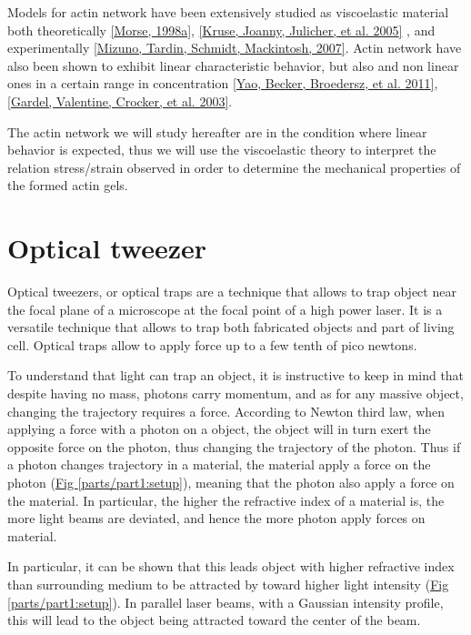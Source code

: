 \documentclass[A4paperpaper,11pt,english]{sphinxmanual}
\begin{document}
Models for actin network have been extensively studied as viscoelastic material
both theoretically {\hyperref[parts/part1:morse1998a]{{[}Morse,  1998a{]}}}, {\hyperref[parts/part1:kruse2005]{{[}Kruse, Joanny, Julicher,  et al.  2005{]}}} , and  experimentally
{\hyperref[parts/part1:mizuno2007]{{[}Mizuno, Tardin, Schmidt, Mackintosh,  2007{]}}}.  Actin network have also been shown to exhibit linear
characteristic behavior, but also and non linear ones  in a certain range in
concentration {\hyperref[parts/part1:yao2011]{{[}Yao, Becker, Broedersz,  et al.  2011{]}}}, {\hyperref[parts/part1:gardel2003]{{[}Gardel, Valentine, Crocker,  et al.  2003{]}}}.

The actin network we will study hereafter are in the condition where linear
behavior is expected, thus we will use the viscoelastic theory to interpret the
relation stress/strain observed in order to determine the mechanical properties
of the formed actin gels.


\section{Optical tweezer}
\label{parts/part1:optical-tweezer}
Optical tweezers, or optical traps are a technique that allows to trap object
near the focal plane of a microscope at the focal point of a high power laser.
It is a versatile technique that allows to trap both fabricated objects and
part of living cell. Optical traps allow to apply force up to a few tenth of
pico newtons.

To understand that light can trap an object, it is instructive to keep in mind
that despite having no mass, photons carry momentum, and as for any massive
object, changing the trajectory requires a force.  According to Newton third
law, when applying a force with a photon on a object, the object will in turn
exert the opposite force on the photon, thus changing the trajectory of the
photon. Thus if a photon changes trajectory in a material, the material apply a
force on the photon (\hyperref[parts/part1:setup]{Fig  \ref*{parts/part1:setup}}), meaning that the photon also apply a force on the
material. In particular, the higher the refractive index of a material is, the
more light beams are deviated, and hence the more photon apply forces on
material.

In particular, it can be shown that this leads object with higher refractive
index than surrounding medium to be attracted by toward higher light intensity
(\hyperref[parts/part1:setup]{Fig  \ref*{parts/part1:setup}}).  In parallel laser beams, with a Gaussian intensity
profile, this will lead to the object being attracted toward the center of the
beam.
\end{document}
